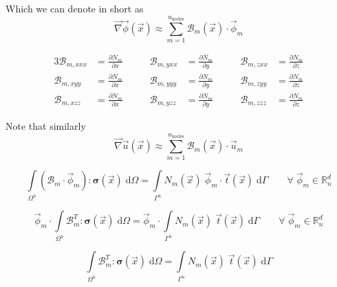 \documentclass[times,namecite]{goose-article}
\begin{document}
Which we can denote in short as
\begin{equation}
  \vec{\nabla} \vec{\phi} (\vec{x})
  \approx
  \sum_{m=1}^{n_\mathrm{nodes}}
  \mathcal{B}_m (\vec{x}) \cdot \vec{\phi}_m
\end{equation}


\begin{alignat}{3}
  \mathcal{B}_{m,x x x} &= \frac{\partial N_m}{\partial x} & \qquad
  \mathcal{B}_{m,y x x} &= \frac{\partial N_m}{\partial y} & \qquad
  \mathcal{B}_{m,z x x} &= \frac{\partial N_m}{\partial z}
  \nonumber
  \\
  \mathcal{B}_{m,x y y} &= \frac{\partial N_m}{\partial x}  & \qquad
  \mathcal{B}_{m,y y y} &= \frac{\partial N_m}{\partial y}  & \qquad
  \mathcal{B}_{m,z y y} &= \frac{\partial N_m}{\partial z}
  \\
  \mathcal{B}_{m,x z z} &= \frac{\partial N_m}{\partial x}  & \qquad
  \mathcal{B}_{m,y z z} &= \frac{\partial N_m}{\partial y}  & \qquad
  \mathcal{B}_{m,z z z} &= \frac{\partial N_m}{\partial z}
\end{alignat}

Note that similarly
\begin{equation}
  \vec{\nabla} \vec{u} (\vec{x})
  \approx
  \sum_{m=1}^{n_\mathrm{nodes}}
  \mathcal{B}_m (\vec{x}) \cdot \vec{u}_m
\end{equation}


\begin{equation}
  \int\limits_{\Omega^h}
    \left( \mathcal{B}_m \cdot \vec{\phi}_m \right) : \bm{\sigma}(\vec{x}) \;
  \mathrm{d}\Omega
  =
  \int\limits_{\Gamma^h}
    N_m (\vec{x}) \; \vec{\phi}_m \cdot \vec{t}(\vec{x}) \;
  \mathrm{d}\Gamma
  \qquad
  \forall \; \vec{\phi}_m \in \mathbb{R}^d_n
\end{equation}


\begin{equation}
  \vec{\phi}_m \cdot
  \int\limits_{\Omega^h}
    \mathcal{B}_m^T : \bm{\sigma}(\vec{x}) \;
  \mathrm{d}\Omega
  =
  \vec{\phi}_m \cdot
  \int\limits_{\Gamma^h}
    N_m(\vec{x}) \; \vec{t}(\vec{x}) \;
  \mathrm{d}\Gamma
  \qquad
  \forall \; \vec{\phi}_m \in \mathbb{R}^d_n
\end{equation}


\begin{equation}
  \int\limits_{\Omega^h}
    \mathcal{B}_m^T : \bm{\sigma}(\vec{x}) \;
  \mathrm{d}\Omega
  =
  \int\limits_{\Gamma^h}
    N_m(\vec{x}) \; \vec{t}(\vec{x}) \;
  \mathrm{d}\Gamma
\end{equation}
\end{document}
